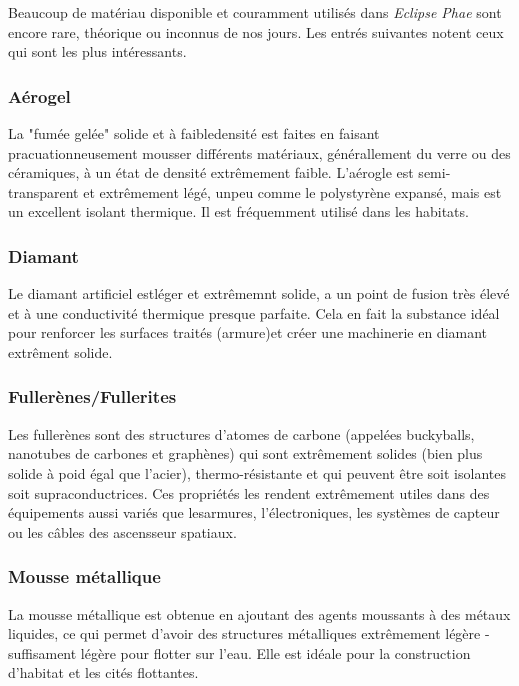 Beaucoup de matériau disponible et couramment utilisés dans \emph{Eclipse Phae} sont encore rare, théorique ou inconnus de nos jours. Les entrés suivantes notent ceux qui sont les plus intéressants. 

\subsubsection{Aérogel} 

La "fumée gelée" solide et à faibledensité est faites en faisant pracuationneusement mousser différents matériaux, générallement du verre ou des céramiques, à un état de densité extrêmement faible. L'aérogle est semi-transparent et extrêmement légé, unpeu comme le polystyrène expansé, mais est un excellent isolant thermique. Il est fréquemment utilisé dans les habitats. 

\subsubsection{Diamant} 

Le diamant artificiel estléger et extrêmemnt solide, a un point de fusion très élevé et à une conductivité thermique presque parfaite. Cela en fait la substance idéal pour renforcer les surfaces traités (armure)et créer une machinerie en diamant extrêment solide. 

\subsubsection{Fullerènes/Fullerites} 

Les fullerènes sont des structures d'atomes de carbone (appelées buckyballs, nanotubes de carbones et graphènes) qui sont extrêmement solides (bien plus solide à poid égal que l'acier), thermo-résistante et qui peuvent être soit isolantes soit supraconductrices. Ces propriétés les rendent extrêmement utiles dans des équipements aussi variés que lesarmures, l'électroniques, les systèmes de capteur ou les câbles des ascensseur spatiaux. 

\subsubsection{Mousse métallique} 

La mousse métallique est obtenue en ajoutant des agents moussants à des métaux liquides, ce qui permet d'avoir des structures métalliques extrêmement légère - suffisament légère pour flotter sur l'eau. Elle est idéale pour la construction d'habitat et les cités flottantes. 

